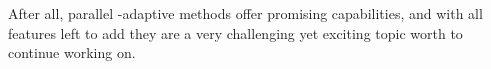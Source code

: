 




After all, parallel \hp-adaptive methods offer promising capabilities, and with all features left to add they are a very challenging yet exciting topic worth to continue working on.


